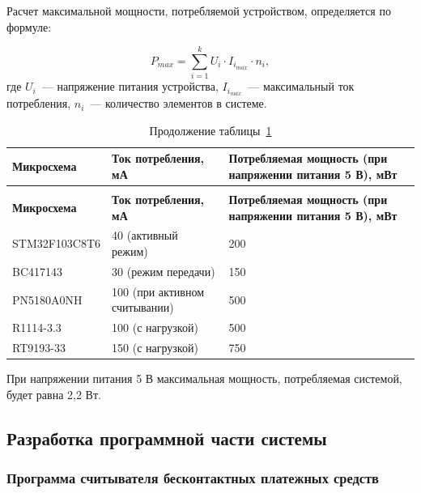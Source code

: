Расчет максимальной мощности, потребляемой устройством, определяется по формуле:

$$
P_{max} = \sum_{i=1}^{k} U_i \cdot I_{i_{max}} \cdot n_i,
$$
где $U_i$~--- напряжение питания устройства, $I_{i_{max}}$~--- максимальный ток потребления, $n_i$~--- количество элементов в системе.

\begin{longtable}[l]{|
P{0.25\textwidth}|
P{0.3\textwidth}|
P{0.37\textwidth}|}

    \caption{Расчет потребляемой мощности}
    \label{tab:elements_power} \\
    \hline
    \textbf{Микросхема} &
    \textbf{Ток потребления, мА} &
    \textbf{Потребляемая мощность (при напряжении питания 5 В), мВт} \\
    \hline
    \endfirsthead

    \caption*{Продолжение таблицы~\ref{tab:elements_power}} \\
    \hline
    \textbf{Микросхема} &
    \textbf{Ток потребления, мА} &
    \textbf{Потребляемая мощность (при напряжении питания 5 В), мВт} \\
    \hline
    \endhead

    \hline
    \endfoot

    \hline
    \endlastfoot

    STM32F103C8T6 & 40 (активный режим) & 200 \\ \hline

    BC417143  & 30 (режим передачи) & 150 \\ \hline

    PN5180A0NH & 100 (при активном считывании) & 500 \\ \hline

    R1114-3.3 & 100 (с нагрузкой) & 500 \\ \hline

    RT9193-33 & 150 (с нагрузкой) & 750 \\ \hline

\end{longtable}

При напряжении питания 5 В максимальная мощность, потребляемая системой, будет равна 2,2 Вт.


\subsection{Разработка программной части системы}

\subsubsection{Программа считывателя бесконтактных платежных средств}

